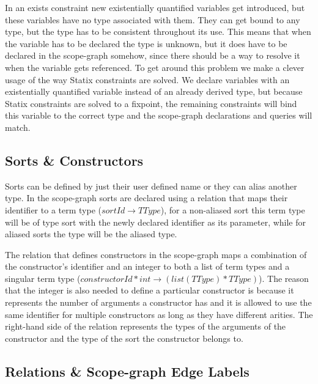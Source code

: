 In an exists constraint new existentially quantified variables get introduced, but these variables have no type associated with them. They can get bound to any type, but the type has to be consistent throughout its use. This means that when the variable has to be declared the type is unknown, but it does have to be declared in the scope-graph somehow, since there should be a way to resolve it when the variable gets referenced. To get around this problem we make a clever usage of the way Statix constraints are solved. We declare variables with an existentially quantified variable instead of an already derived type, but because Statix constraints are solved to a fixpoint, the remaining constraints will bind this variable to the correct type and the scope-graph declarations and queries will match.

\subsection{Sorts \& Constructors}

Sorts can be defined by just their user defined name or they can alias another type. In the scope-graph sorts are declared using a relation that maps their identifier to a term type (\(sortId \rightarrow TType\)), for a non-aliased sort this term type will be of type sort with the newly declared identifier as its parameter, while for aliased sorts the type will be the aliased type.

The relation that defines constructors in the scope-graph maps a combination of the constructor's identifier and an integer to both a list of term types and a singular term type (\(constructorId * int \rightarrow (list(TType) * TType)\)). The reason that the integer is also needed to define a particular constructor is because it represents the number of arguments a constructor has and it is allowed to use the same identifier for multiple constructors as long as they have different arities. The right-hand side of the relation represents the types of the arguments of the constructor and the type of the sort the constructor belongs to.

\subsection{Relations \& Scope-graph Edge Labels}

